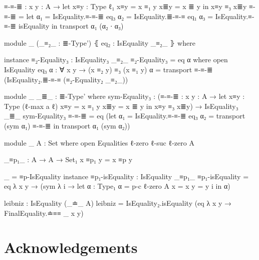 \documentclass{article}
\begin{document}
\begin{code}
        ≡-≡-≣ : {x y : A} → let
          x≡y : Type ℓ₁
          x≡y = x ≡₁ y
          x≣y = x ≣ y
          in x≡y ≡₃ x≣y
        ≡-≡-≣ = let
          α₁ = IsEquality.≡-≡-≣ eq₃
          α₂ = IsEquality.≣-≡-≡ eq₁
          α₃ = IsEquality.≡-≡-≣ isEquality
          in transport α₁ (α₂ ∙ α₃)

      module _
        (_≡₂_ : ≣-Type')
        ⦃ eq₂ : IsEquality _≡₂_ ⦄
        where

        instance
          ≡₂-Equality₃ : IsEquality₃ _≡₂_
          ≡₂-Equality₃ = eq α
            where
              open IsEquality eq₃
              α : ∀ {x y} → (x ≡₂ y) ≡₃ (x ≡₁ y)
              α = transport ≡-≡-≣ (IsEquality₂.≣-≡-≡ (≡₂-Equality₂ _≡₂_))

      module _ {_≣_ : ≣-Type'} where
        sym-Equality₃ : (≡-≡-≣ : {x y : A} → let
          x≡y : Type (ℓ-max a ℓ)
          x≡y = x ≡₁ y
          x≣y = x ≣ y
          in x≡y ≡₃ x≣y)
          → IsEquality₃ _≣_
        sym-Equality₃ ≡-≡-≣ = eq (let
          α₁ = IsEquality.≡-≡-≣ eq₃
          α₂ = transport (sym α₁) ≡-≡-≣
          in transport α₁ (sym α₂))

module _ {A : Set} where
  open Equalities {ℓ-zero} {ℓ-suc ℓ-zero} {A}

  _≡p₁_ : A → A → Set₁
  x ≡p₁ y = x ≡p y

  _ = ≡p-IsEquality
  instance
    ≡p₁-isEquality : IsEquality _≡p₁_
    ≡p₁-isEquality = eq λ {x y} → (sym λ i → let
      α : Type₁
      α = p-c {ℓ-zero} {A} {x = x} {y = y} i
      in α)



  leibniz : IsEquality  (_≐_ {A})
  leibniz =
    IsEquality₂.isEquality (eq λ {x y} → FinalEquality.≐≡≡ {_} {x} {y})

\end{code}

\section*{Acknowledgements}



\end{document}
